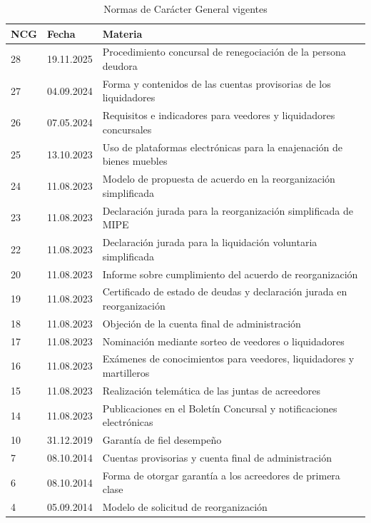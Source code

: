 \begin{table}[htbp]
\centering
\small
\caption{Normas de Carácter General vigentes}
\label{tab:ncg-vigentes}
\begin{tabularx}{\textwidth}{@{}p{} p{} X@{}}
\toprule
\textbf{NCG} & \textbf{Fecha} & \textbf{Materia} \\
\midrule
28 & 19.11.2025 & Procedimiento concursal de renegociación de la persona deudora \\
27 & 04.09.2024 & Forma y contenidos de las cuentas provisorias de los liquidadores \\
26 & 07.05.2024 & Requisitos e indicadores para veedores y liquidadores concursales \\
25 & 13.10.2023 & Uso de plataformas electrónicas para la enajenación de bienes muebles \\
24 & 11.08.2023 & Modelo de propuesta de acuerdo en la reorganización simplificada \\
23 & 11.08.2023 & Declaración jurada para la reorganización simplificada de MIPE \\
22 & 11.08.2023 & Declaración jurada para la liquidación voluntaria simplificada \\
20 & 11.08.2023 & Informe sobre cumplimiento del acuerdo de reorganización \\
19 & 11.08.2023 & Certificado de estado de deudas y declaración jurada en reorganización \\
18 & 11.08.2023 & Objeción de la cuenta final de administración \\
17 & 11.08.2023 & Nominación mediante sorteo de veedores o liquidadores \\
16 & 11.08.2023 & Exámenes de conocimientos para veedores, liquidadores y martilleros \\
15 & 11.08.2023 & Realización telemática de las juntas de acreedores \\
14 & 11.08.2023 & Publicaciones en el Boletín Concursal y notificaciones electrónicas \\
10 & 31.12.2019 & Garantía de fiel desempeño \\
7  & 08.10.2014 & Cuentas provisorias y cuenta final de administración \\
6  & 08.10.2014 & Forma de otorgar garantía a los acreedores de primera clase \\
4  & 05.09.2014 & Modelo de solicitud de reorganización \\
\bottomrule
\end{tabularx}
\end{table}

